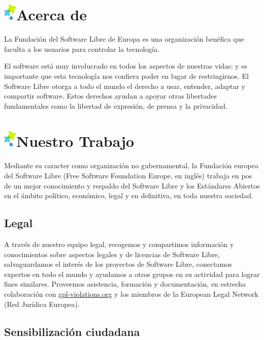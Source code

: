 \documentclass[10pt,foldmark,tumble]{leaflet}
\begin{document}
\section{\includegraphics{item.png}Acerca de}

La Fundación del Software Libre de Europa es una organización benéfica que faculta a los usuarios para controlar la tecnología.

El software está muy involucrado en todos los aspectos de nuestras vidas; y es importante que esta tecnología nos confiera poder en lugar de restringirnos. El Software Libre otorga a todo el mundo el derecho a usar, entender, adaptar y compartir software. Estos derechos ayudan a apoyar otras libertades fundamentales como la libertad de expresión, de prensa y la privacidad.

\section{\includegraphics{item.png}Nuestro Trabajo}

 Mediante su caracter como organización no gubernamental, la Fundación europea del Software Libre (Free Software Foundation Europe, en inglés) trabaja en pos de un mejor conocimiento y respaldo del Software Libre y los Estándares Abiertos en el ámbito político, económico, legal y en definitiva, en toda nuestra sociedad.

 \subsection{Legal}

    A través de nuestro equipo legal, recogemos y compartimos información y conocimientos sobre aspectos legales y de licencias de Software Libre, salvaguardamos el interés de los proyectos de Software Libre, conectamos expertos en todo el mundo y ayudamos a otros grupos en su actividad para lograr fines similares. Proveemos asistencia, formación y documentación, en estrecha colaboración con \url{gpl-violations.org} y los miembros de la European Legal Network (Red Jurídica Europea).
        
\subsection{Sensibilización ciudadana}
\end{document}
